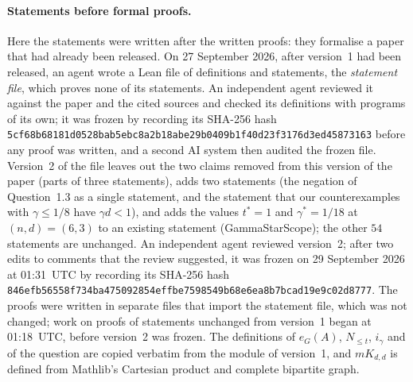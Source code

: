 \documentclass[11pt]{article}
\theoremstyle{remark}
\newcommand{\Nle}[1]{N_{\le #1}}
\begin{document}
\paragraph{Statements before formal proofs.}
Here the statements were written after the written proofs: they formalise a
paper that had already been released. On 27 September 2026, after version~1
had been released, an agent wrote a Lean file of definitions and statements,
the \emph{statement file}, which proves none of its statements. An independent
agent reviewed it against the paper and the cited sources and checked its
definitions with programs of its own; it was frozen by recording its SHA-256
hash \texttt{5cf68b68181d0528bab5ebc8a2b18abe\allowbreak 29b0409b1f40d23f3176d3ed45873163}
before any proof was written, and a second AI system then audited the frozen
file. Version~2 of the file leaves out the two claims
removed from this version of the paper (parts of three statements), adds two
statements (the negation of Question~1.3 as a single statement, and the
statement that our counterexamples with $\gamma\le1/8$ have $\gamma d<1$), and
adds the values $t^*=1$ and $\gamma^*=1/18$ at $(n,d)=(6,3)$ to an existing
statement (GammaStarScope); the
other $54$ statements are unchanged. An independent agent reviewed version~2;
after two edits to comments that the review suggested, it was frozen on
29 September 2026 at 01:31~UTC by recording its SHA-256 hash
\texttt{846efb56558f734ba475092854effbe7\allowbreak 598549b68e6ea8b7bcad19e9c02d8777}.
The proofs were written in separate files that import the statement file,
which was not changed; work on proofs of statements unchanged from
version~1 began at 01:18~UTC, before version~2 was frozen. The definitions of $e_G(A)$, $\Nle t$,
$i_\gamma$ and of the question are copied verbatim from the module of
version~1, and $mK_{d,d}$ is defined from Mathlib's Cartesian product and
complete bipartite graph.
\end{document}
